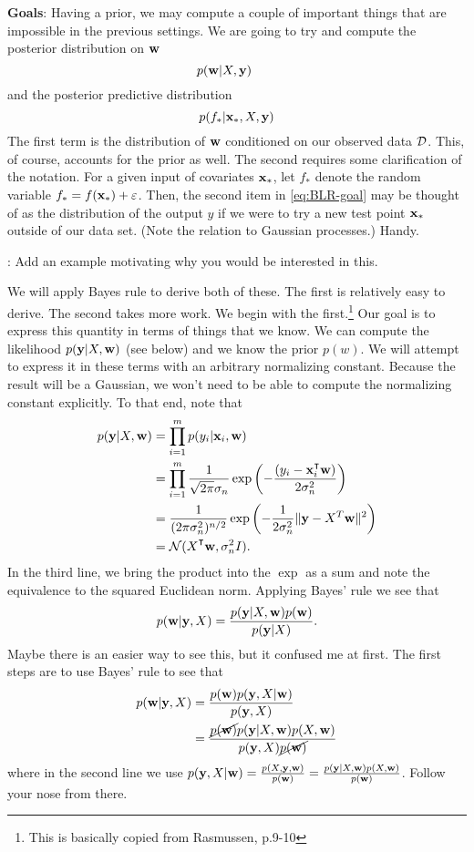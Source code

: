 \noindent
\textbf{Goals}: Having a prior, we may compute a couple of important things that are impossible in the previous settings. We are going to try and compute the posterior distribution on ${ \bf w}$
\begin{equation} \label{eq:BLR-goal}
p({ \bf w}|X, {\bf y}) \hspace{2em}
\end{equation}
and the posterior predictive distribution 
$$
p(f_*|{ \bf x}_*, X, {\bf y})
$$
The first term is the distribution of ${ \bf w}$ conditioned on our observed data $\mathcal{D}$. This, of course, accounts for the prior as well. The second requires some clarification of the notation. For a given input of covariates ${ \bf x}_*$, let $f_*$ denote the random variable $f_* = f({ \bf x}_*) + \varepsilon$. Then, the second item in \eqref{eq:BLR-goal} may be thought of as the distribution of the output $y$ if we were to try a new test point ${ \bf x}_*$ outside of our data set. (Note the relation to Gaussian processes.) Handy. 

: Add an example motivating why you would be interested in this. 

We will apply Bayes rule to derive both of these. The first is relatively easy to derive. The second takes more work. We begin with the first.\footnote{This is basically copied from Rasmussen, p.9-10} Our goal is to express this quantity in terms of things that we know. We can compute the likelihood $p({\bf y}|X, { \bf w})$ (see below) and we know the prior $p(w)$. We will attempt to express it in these terms with an arbitrary normalizing constant. Because the result will be a Gaussian, we won't need to be able to compute the normalizing constant explicitly. 
To that end, note that
\begin{align}
p(\y|X, \w) & = \prod_{i=1}^m p(y_i|\x_i, \w)\\ \label{eq:BLR-pyxw}
& = \prod_{i=1}^m \frac{1}{\sqrt{2\pi}\sigma_n} \exp\left( -\frac{(y_i - \x_i^\T \w)}{2\sigma_n^2} \right)\\
& = \frac{1}{(2\pi\sigma_n^2)^{n/2}}\exp\left( -\frac{1}{2\sigma_n^2}\|\y - X^T\w\|^2 \right)\\
& = \calN(X^\T\w, \sigma_n^2 I).
\end{align}
In the third line, we bring the product into the $\exp$ as a sum and note the equivalence to the squared Euclidean norm. Applying Bayes' rule we see that
\begin{equation}\label{eq:BLR-eq2}
p({ \bf w}|{\bf y}, X) = \frac{p({\bf y}|X, { \bf w})p({ \bf w})}{p({\bf y}| X)}.
\end{equation}
Maybe there is an easier way to see this, but it confused me at first. The first steps are to use Bayes' rule to see that
\begin{align}
p({ \bf w}|{\bf y}, X) & = \frac{p({ \bf w})p({\bf y}, X|{ \bf w})}{p({\bf y}, X)}\\
& = \frac{\cancel{p({ \bf w})}p({\bf y}| X, { \bf w})p(X, { \bf w})}{p({\bf y}, X)\cancel{p({ \bf w})}}
\end{align}
where in the second line we use $p({\bf y}, X|{ \bf w}) = \frac{p(X, {\bf y}, { \bf w})}{p({ \bf w})} = \frac{p({\bf y}| X, { \bf w})p(X, { \bf w})}{p({ \bf w})}$. Follow your nose from there. 

